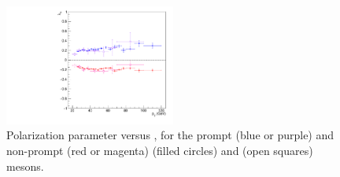 \begin{figure}[h]
\centering
\includegraphics[width=0.5\textwidth]{Figures/chapter5/par_lth_summary_statonly.pdf}
\caption{Polarization parameter \lth versus \pt, 
for the prompt (blue or purple) and non-prompt (red or magenta)
\jpsi (filled circles) and \psip (open squares) mesons.}
\label{fig:lth-summary-stat}
\end{figure}
